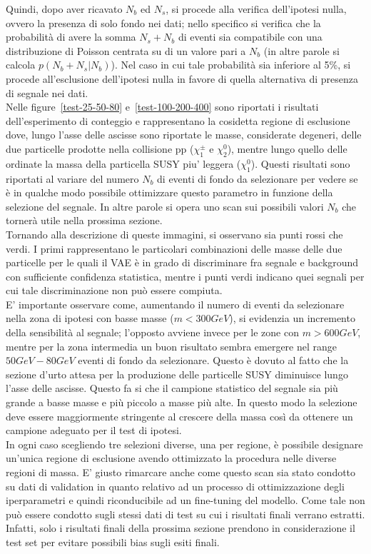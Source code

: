 Quindi, dopo aver ricavato $N_b$ ed $N_s$, si procede alla verifica dell'ipotesi nulla, ovvero la presenza di solo fondo nei dati; nello specifico si verifica che la probabilità di avere la somma $N_s + N_b$ di eventi sia compatibile con una distribuzione di Poisson centrata su di un valore pari a $N_b$ (in altre parole si calcola $p(N_b + N_s | N_b)$). Nel caso in cui tale probabilità sia inferiore al 5\%, si procede all'esclusione dell'ipotesi nulla in favore di quella alternativa di presenza di segnale nei dati.\\
Nelle figure~\ref{test-25-50-80} e~\ref{test-100-200-400} sono riportati i risultati dell'esperimento di conteggio e rappresentano la cosidetta regione di esclusione dove, lungo l'asse delle ascisse sono riportate le masse, considerate degeneri, delle due particelle prodotte nella collisione pp ($\chi^\pm_1$ e $\chi^0_2$), mentre lungo quello delle ordinate la massa della particella SUSY piu' leggera ($\chi^0_1$). Questi risultati sono riportati al variare del numero $N_{b}$ di eventi di fondo da selezionare per vedere se è in qualche modo possibile ottimizzare questo parametro in funzione della selezione del segnale. In altre parole si opera uno scan sui possibili valori $N_{b}$ che tornerà utile nella prossima sezione.\\
Tornando alla descrizione di queste immagini, si osservano sia punti rossi che verdi. I primi rappresentano le particolari combinazioni delle masse delle due particelle per le quali il VAE è in grado di discriminare fra segnale e background con sufficiente confidenza statistica, mentre i punti verdi indicano  quei segnali per cui tale discriminazione non può essere compiuta.\\
E' importante osservare come, aumentando il numero di eventi da selezionare nella zona di ipotesi con basse masse ($m < 300 GeV$), si evidenzia un incremento della sensibilità al segnale; l'opposto avviene invece per le zone con $m > 600 GeV$, mentre per la zona intermedia un buon risultato sembra emergere nel range $50 GeV - 80 GeV$ eventi di fondo da selezionare. Questo è dovuto al fatto che la sezione d'urto attesa per la produzione delle particelle SUSY diminuisce lungo l'asse delle ascisse. Questo fa si che il campione statistico del segnale sia più grande a basse masse e più piccolo a masse più alte. In questo modo la selezione deve essere maggiormente stringente al crescere della massa così da ottenere un campione adeguato per il test di ipotesi.\\
In ogni caso scegliendo tre selezioni diverse, una per regione, è possibile designare un'unica regione di esclusione avendo ottimizzato la procedura nelle diverse regioni di massa. E' giusto rimarcare anche come questo scan sia stato condotto su dati di validation in quanto relativo ad un processo di ottimizzazione degli iperparametri e quindi riconducibile ad un fine-tuning del modello. Come tale non può essere condotto sugli stessi dati di test su cui i risultati finali verrano estratti. Infatti, solo i risultati finali della prossima sezione prendono in considerazione il test set per evitare possibili bias sugli esiti finali.

